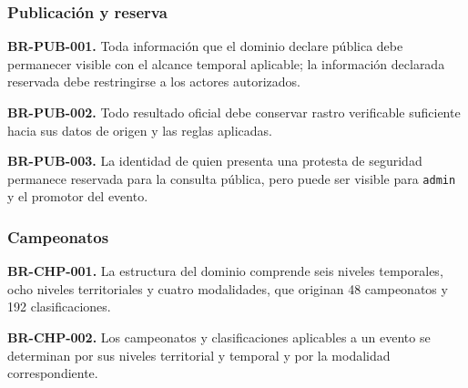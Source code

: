 \documentclass[10pt,letterpaper]{article}
\begin{document}
\subsubsection{Publicación y reserva}
\noindent\textbf{BR-PUB-001.} Toda información que el dominio declare pública debe permanecer visible con el alcance temporal aplicable; la información declarada reservada debe restringirse a los actores autorizados.\par
\noindent\textbf{BR-PUB-002.} Todo resultado oficial debe conservar rastro verificable suficiente hacia sus datos de origen y las reglas aplicadas.\par
\noindent\textbf{BR-PUB-003.} La identidad de quien presenta una protesta de seguridad permanece reservada para la consulta pública, pero puede ser visible para \texttt{admin} y el promotor del evento.\par
\subsubsection{Campeonatos}
\noindent\textbf{BR-CHP-001.} La estructura del dominio comprende seis niveles temporales, ocho niveles territoriales y cuatro modalidades, que originan 48 campeonatos y 192 clasificaciones.\par
\noindent\textbf{BR-CHP-002.} Los campeonatos y clasificaciones aplicables a un evento se determinan por sus niveles territorial y temporal y por la modalidad correspondiente.\par
\end{document}
